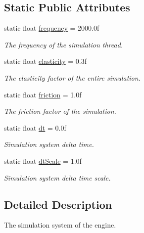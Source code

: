 \subsection*{Static Public Attributes}
\begin{DoxyCompactItemize}
\item 
\mbox{\label{class_blade_1_1_simulation_system_afb86549d4ab57f5a426aa8cf228d76eb}} 
static float \hyperlink{class_blade_1_1_simulation_system_afb86549d4ab57f5a426aa8cf228d76eb}{frequency} = 2000.\+0f
\begin{DoxyCompactList}\small\item\em The frequency of the simulation thread. \end{DoxyCompactList}\item 
static float \hyperlink{class_blade_1_1_simulation_system_aa7d0bb11aafd59e102723b08271c7d9e}{elasticity} = 0.\+3f
\begin{DoxyCompactList}\small\item\em The elasticity factor of the entire simulation. \end{DoxyCompactList}\item 
static float \hyperlink{class_blade_1_1_simulation_system_a899426b05cdf0fa83104ea106a2aab04}{friction} = 1.\+0f
\begin{DoxyCompactList}\small\item\em The friction factor of the simulation. \end{DoxyCompactList}\item 
\mbox{\label{class_blade_1_1_simulation_system_a046b4016dac9015dc1b3cb2c59cdf860}} 
static float \hyperlink{class_blade_1_1_simulation_system_a046b4016dac9015dc1b3cb2c59cdf860}{dt} = 0.\+0f
\begin{DoxyCompactList}\small\item\em Simulation system delta time. \end{DoxyCompactList}\item 
static float \hyperlink{class_blade_1_1_simulation_system_ad7c3441e3a8a9b97fbdd12ec936b963e}{dt\+Scale} = 1.\+0f
\begin{DoxyCompactList}\small\item\em Simulation system delta time scale. \end{DoxyCompactList}\end{DoxyCompactItemize}


\subsection{Detailed Description}
The simulation system of the engine. 

